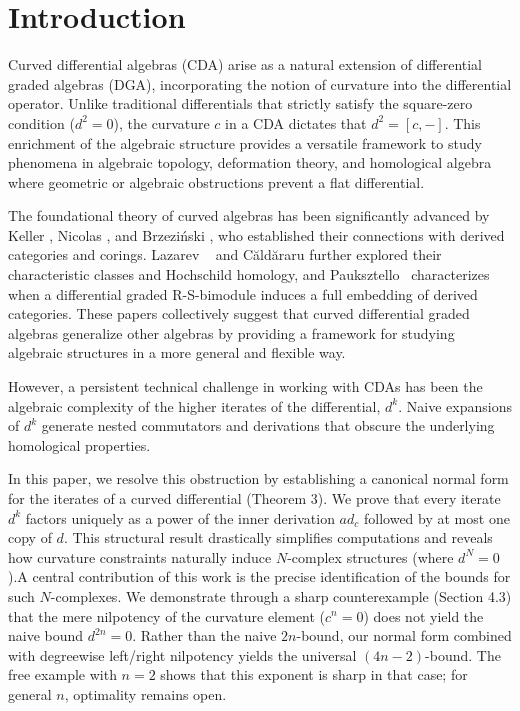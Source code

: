 \documentclass[preprint,12pt]{elsarticle}
\begin{document}


\section{Introduction}

Curved differential algebras (CDA) arise as a natural extension of differential graded algebras (DGA), incorporating the notion of curvature into the differential operator. Unlike traditional differentials that strictly satisfy the square-zero condition ($d^2=0$), the curvature $c$ in a CDA dictates that $d^2 = [c, -]$. This enrichment of the algebraic structure provides a versatile framework to study phenomena in algebraic topology, deformation theory, and homological algebra where geometric or algebraic obstructions prevent a flat differential.

The foundational theory of curved algebras has been significantly advanced by Keller  \cite{KellerOn}, Nicolas \cite{Nicolas2008bar}, and Brzeziński \cite{Brzezinski2013Curved}, who established their connections with derived categories and corings. Lazarev ~\cite{Lazarev2012} and Căldăraru \cite{Cldraru2010CurvedAA} further explored their characteristic classes and Hochschild homology, and Pauksztello~\cite{Pauksztello2009} characterizes when a differential graded R-S-bimodule induces a full embedding of derived categories. These papers collectively suggest that curved differential graded algebras generalize other algebras by providing a framework for studying algebraic structures in a more general and flexible way.

However, a persistent technical challenge in working with CDAs has been the algebraic complexity of the higher iterates of the differential, $d^k$. Naive expansions of $d^k$ generate nested commutators and derivations that obscure the underlying homological properties.

In this paper, we resolve this obstruction by establishing a canonical normal form for the iterates of a curved differential (Theorem 3). We prove that every iterate $d^k$ factors uniquely as a power of the inner derivation $ad_c$ followed by at most one copy of $d$. This structural result drastically simplifies computations and reveals how curvature constraints naturally induce $N$-complex structures (where $d^N=0$).A central contribution of this work is the precise identification of the bounds for such $N$-complexes. We demonstrate through a sharp counterexample (Section 4.3) that the mere nilpotency of the curvature element ($c^n=0$) does not yield the naive bound $d^{2n}=0$. Rather than the naive $2n$-bound, our normal form combined with degreewise left/right nilpotency yields the universal $(4n-2)$-bound.
The free example with $n=2$ shows that this exponent is sharp in that case; for general $n$, optimality remains open.
\end{document}
